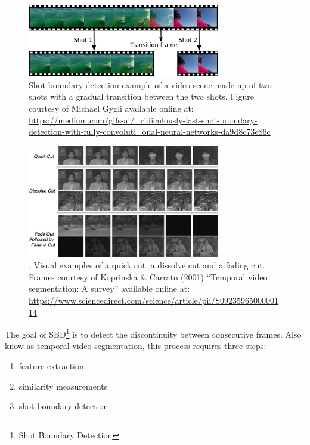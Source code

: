 \begin{figure}[h] 
\centerline{\includegraphics[width=0.75\textwidth]{figures/shot_boundary_detection.png}}
\caption{\label{fig:shot_boundary_detection}Shot boundary detection example of a video scene made up of two shots with a gradual transition between the two shots. Figure courtesy of Michael Gygli available online at: \url{https://medium.com/gifs-ai/\_ridiculously-fast-shot-boundary-detection-with-fully-convoluti\_onal-neural-networks-da9d8c73e86c}}
\end{figure}

\begin{figure}[h] 
\centerline{\includegraphics[width=0.75\textwidth]{figures/video_transitions.png}}
\caption{\label{fig:video_transitions}. Visual examples of a quick cut, a dissolve cut and a fading cut. Frames courtesy of Koprinska \& Carrato (2001) ``Temporal video segmentation: A survey'' available online at: \url{https://www.sciencedirect.com/science/article/pii/S0923596500000114}}
\end{figure}

The goal of SBD\footnote{Shot Boundary Detection} is to detect the discontinuity between consecutive frames. Also know as temporal video segmentation, this process requires three steps:
\begin{enumerate}
    \item feature extraction
    \item similarity measurements
    \item shot boundary detection
\end{enumerate}

